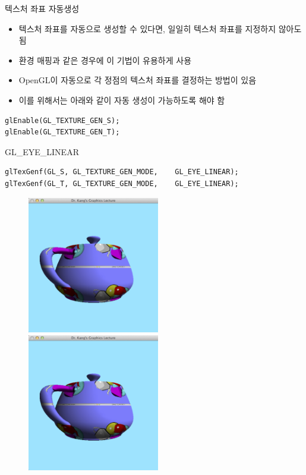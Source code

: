 \documentclass{beamer}
\begin{document}
\begin{frame}[fragile]{텍스처 좌표 자동생성}

\begin{itemize}
\item 텍스처 좌표를 자동으로 생성할 수 있다면, 일일히 텍스처 좌표를 지정하지 않아도 됨
\item 환경 매핑과 같은 경우에 이 기법이 유용하게 사용
\item OpenGL이 자동으로 각 정점의 텍스처 좌표를 결정하는 방법이 있음
\item 이를 위해서는 아래와 같이 자동 생성이 가능하도록 해야 함
\end{itemize}

\lstset{language=C++, escapechar=^} 
\begin{lstlisting}
glEnable(GL_TEXTURE_GEN_S);
glEnable(GL_TEXTURE_GEN_T);
\end{lstlisting}

\end{frame}


\begin{frame}[fragile]{{\sf GL\_EYE\_LINEAR}}

\lstset{language=C++} 
\begin{lstlisting}
glTexGenf(GL_S, GL_TEXTURE_GEN_MODE, 	GL_EYE_LINEAR);
glTexGenf(GL_T, GL_TEXTURE_GEN_MODE, 	GL_EYE_LINEAR);
\end{lstlisting}

\begin{figure}[h!]
  \centering
	\includegraphics[height=6cm]{OGL_texture/eyeLinear1.png}
	\includegraphics[height=6cm]{OGL_texture/eyeLinear2.png}
\end{figure}

\end{frame}
\end{document}
